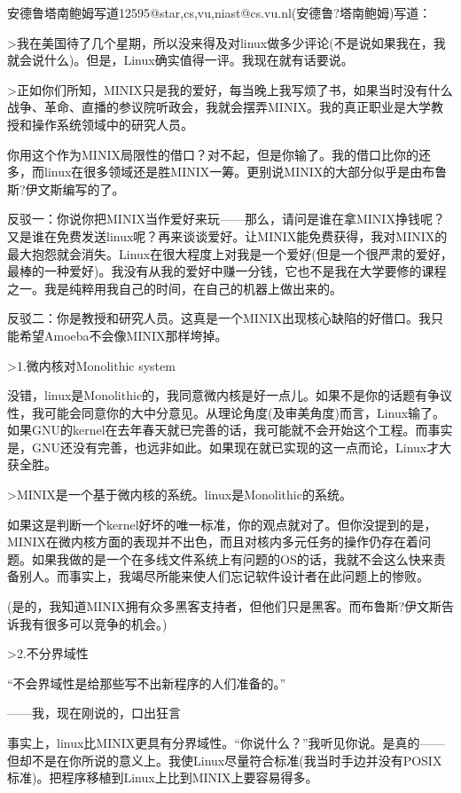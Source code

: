  

安德鲁塔南鲍姆写道12595@star,cs,vu,niast@cs.vu.nl(安德鲁?塔南鲍姆)写道：

>我在美国待了几个星期，所以没来得及对linux做多少评论(不是说如果我在，我就会说什么)。但是，Linux确实值得一评。我现在就有话要说。

>正如你们所知，MINIX只是我的爱好，每当晚上我写烦了书，如果当时没有什么战争、革命、直播的参议院听政会，我就会摆弄MINIX。我的真正职业是大学教授和操作系统领域中的研究人员。

 

你用这个作为MINIX局限性的借口？对不起，但是你输了。我的借口比你的还多，而linux在很多领域还是胜MINIX一筹。更别说MINIX的大部分似乎是由布鲁斯?伊文斯编写的了。

反驳一：你说你把MINIX当作爱好来玩——那么，请问是谁在拿MINIX挣钱呢？又是谁在免费发送linux呢？再来谈谈爱好。让MINIX能免费获得，我对MINIX的最大抱怨就会消失。Linux在很大程度上对我是一个爱好(但是一个很严肃的爱好，最棒的一种爱好)。我没有从我的爱好中赚一分钱，它也不是我在大学要修的课程之一。我是纯粹用我自己的时间，在自己的机器上做出来的。

反驳二：你是教授和研究人员。这真是一个MINIX出现核心缺陷的好借口。我只能希望Amoeba不会像MINIX那样垮掉。

 

>1.微内核对Monolithic system

没错，linux是Monolithic的，我同意微内核是好一点儿。如果不是你的话题有争议性，我可能会同意你的大中分意见。从理论角度(及审美角度)而言，Linux输了。如果GNU的kernel在去年春天就已完善的话，我可能就不会开始这个工程。而事实是，GNU还没有完善，也远非如此。如果现在就已实现的这一点而论，Linux才大获全胜。

>MINIX是一个基于微内核的系统。linux是Monolithic的系统。

如果这是判断一个kernel好坏的唯一标准，你的观点就对了。但你没提到的是，MINIX在微内核方面的表现并不出色，而且对核内多元任务的操作仍存在着问题。如果我做的是一个在多线文件系统上有问题的OS的话，我就不会这么快来责备别人。而事实上，我竭尽所能来使人们忘记软件设计者在此问题上的惨败。

(是的，我知道MINIX拥有众多黑客支持者，但他们只是黑客。而布鲁斯?伊文斯告诉我有很多可以竞争的机会。)

 

>2.不分界域性

“不会界域性是给那些写不出新程序的人们准备的。”

——我，现在刚说的，口出狂言

 

事实上，linux比MINIX更具有分界域性。“你说什么？”我听见你说。是真的——但却不是在你所说的意义上。我使Linux尽量符合标准(我当时手边并没有POSIX标准)。把程序移植到Linux上比到MINIX上要容易得多。

